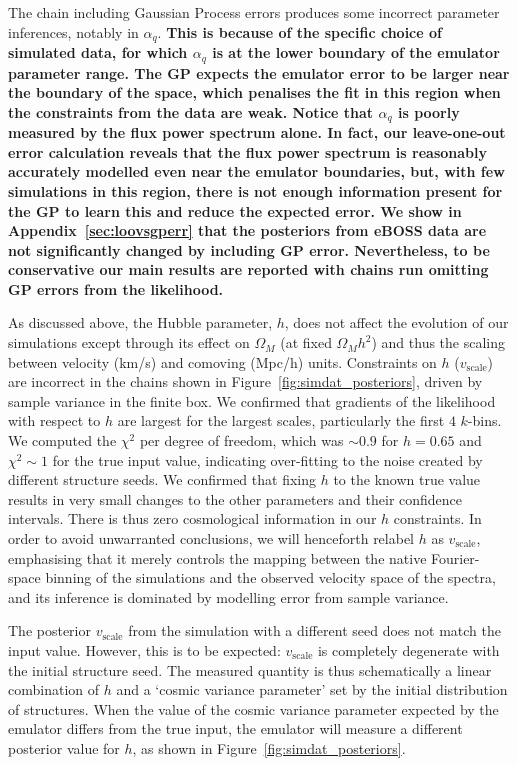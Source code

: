 The chain including Gaussian Process errors produces some incorrect parameter inferences, notably in $\alpha_q$. \textbf{This is because of the specific choice of simulated data, for which $\alpha_q$ is at the lower boundary of the emulator parameter range. The GP expects the emulator error to be larger near the boundary of the space, which penalises the fit in this region when the constraints from the data are weak. Notice that $
\alpha_q$ is poorly measured by the flux power spectrum alone. In fact, our leave-one-out error calculation reveals that the flux power spectrum is reasonably accurately modelled even near the emulator boundaries, but, with few simulations in this region, there is not enough information present for the GP to learn this and reduce the expected error. We show in Appendix~\ref{sec:loovsgperr} that the posteriors from eBOSS data are not significantly changed by including GP error. Nevertheless, to be conservative our main results are reported with chains run omitting GP errors from the likelihood.}

As discussed above, the Hubble parameter, $h$, does not affect the evolution of our simulations except through its effect on $\Omega_M$ (at fixed $\Omega_M h^2$) and thus the scaling between velocity (km/s) and comoving (Mpc/h) units.
Constraints on $h$ ($v_\mathrm{scale}$) are incorrect in the chains shown in Figure~\ref{fig:simdat_posteriors}, driven by sample variance in the finite box.
We confirmed that gradients of the likelihood with respect to $h$ are largest for the largest scales, particularly the first $4$ $k$-bins.
We computed the $\chi^2$ per degree of freedom, which was $\sim 0.9$ for $h = 0.65$ and $\chi^2 \sim 1$ for the true input value, indicating over-fitting to the noise created by different structure seeds.
We confirmed that fixing $h$ to the known true value results in very small changes to the other parameters and their confidence intervals.
There is thus zero cosmological information in our $h$ constraints.
In order to avoid unwarranted conclusions, we will henceforth relabel $h$ as $v_\mathrm{scale}$, emphasising that it merely controls the mapping between the native Fourier-space binning of the simulations and the observed velocity space of the spectra, and its inference is dominated by modelling error from sample variance. 

The posterior $v_\mathrm{scale}$ from the simulation with a different seed does not match the input value. However, this is to be expected: $v_\mathrm{scale}$ is completely degenerate with the initial structure seed. The measured quantity is thus schematically a linear combination of $h$ and a `cosmic variance parameter' set by the initial distribution of structures. When the value of the cosmic variance parameter expected by the emulator differs from the true input, the emulator will measure a different posterior value for $h$, as shown in Figure~\ref{fig:simdat_posteriors}.
